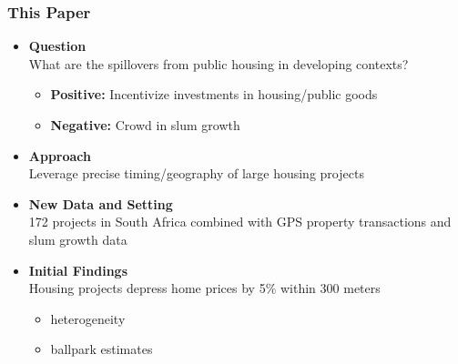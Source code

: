 \documentclass[aspectratio=149]{beamer}
\begin{document}

\begin{frame}
\frametitle{This Paper}

\begin{itemize}
  \item \textbf{Question} \\ 
  \vspace{.1cm}
  What are the spillovers from public housing in developing contexts?
  \vspace{.1cm}
    \begin{itemize}
      \item \textbf{Positive:} Incentivize investments in housing/public goods
      \item \textbf{Negative:} Crowd in slum growth
    \end{itemize}

\vspace{1mm}
\item \textbf{Approach} \\ Leverage precise timing/geography of large housing projects
\vspace{1mm}
\item \textbf{New Data and Setting} \\ 172 projects in South Africa combined with GPS property transactions and slum growth data
\vspace{1mm}
\item \textbf{Initial Findings} \\ Housing projects depress home prices by 5\% within 300 meters
\begin{itemize}
  \item heterogeneity
  \item ballpark estimates
\end{itemize}
\end{itemize}

\end{frame}


\end{document}
